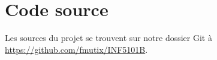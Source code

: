 \section{Code source}

Les sources du projet se trouvent sur notre dossier Git à
\href{https://github.com/fmutix/INF5101B}
{https://github.com/fmutix/INF5101B}.
